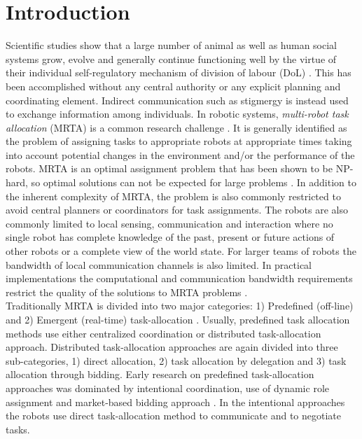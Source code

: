 \documentclass{llncs}
\begin{document}
\section{Introduction}
\label{sec:intro}
Scientific studies show that a large number of animal as well as human social systems grow, evolve and generally continue functioning well by the virtue of their individual self-regulatory mechanism of division of labour (DoL)  \cite{Bonabeau+1999}.
This has been accomplished without any central authority or any explicit planning and coordinating element.
Indirect communication such as stigmergy is instead used to exchange information among individuals. 
In robotic systems, \textit{multi-robot task allocation} (MRTA) is a common research challenge \cite{Parker2008}.
It is generally identified as the problem of assigning tasks to appropriate robots at appropriate times taking into account potential changes in the environment and/or the performance of the robots.
MRTA is an optimal assignment problem that has been shown to be NP-hard, so optimal solutions can not be expected for large problems \cite{Gerkey+2004}.
In addition to the inherent complexity of MRTA, the problem is also commonly restricted to avoid central planners or coordinators for task assignments.
The robots are also commonly limited to local sensing, communication and interaction \cite{Lerman+2006} where no single robot has complete knowledge of the past, present or future actions of other robots or a complete view of the world state.
For larger teams of robots the bandwidth of local communication channels is also limited.
In practical implementations the computational and communication bandwidth requirements restrict the quality of the solutions to MRTA problems \cite{Gerkey+2004,Lerman+2006}.\\
Traditionally MRTA is divided into two major categories: 1) Predefined (off-line) and 2) Emergent (real-time) task-allocation \cite{Shen+2001}.
Usually, predefined task allocation methods use either centralized coordination or distributed task-allocation approach.
Distributed task-allocation approaches are again divided into three sub-categories, 1) direct allocation, 2) task allocation by delegation and 3) task allocation through bidding.
Early research on predefined task-allocation approaches was dominated by intentional coordination, use of dynamic role assignment \cite{Parker2008} and market-based bidding approach \cite{Dias+2006}.
In the intentional approaches the robots use direct task-allocation method to communicate and to negotiate tasks.
\end{document}
